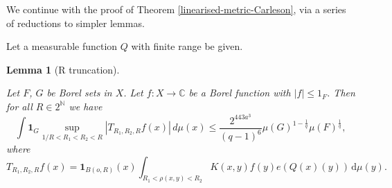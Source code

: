 \documentclass[10pt,a4paper]{article}
\theoremstyle{plain}
\newtheorem{lemma}[theorem]{Lemma}
\theoremstyle{definition}
\numberwithin{equation}{subsection}
\newcommand{\N}{{\mathbb{N}}}
\newcommand{\lean}[1]{}
\newcommand{\uses}[1]{}
\newcommand{\leanok}{}
\def\C{\mathbb{C}}
\begin{document}
We continue with the proof of Theorem \ref{linearised-metric-Carleson}, via a series of reductions to simpler lemmas.

Let a measurable function $Q$ with finite range be given.



\begin{lemma}[R truncation]
    \label{R-truncation}
    \leanok
    \lean{R_truncation}
    \uses{S-truncation}

    Let $F$, $G$ be Borel sets in $X$. Let $f:X\to \C$ be a Borel function with $|f|\le 1_F$. Then for all $R\in 2^\N$ we have
    \begin{equation} \label{Rcut}
        \int \mathbf{1}_G \sup_{1/R<R_1<R_2<R} |T_{R_1,R_2,R} f(x)|\, d\mu(x) \le \frac{2^{443a^3}}{(q-1)^6} \mu(G)^{1-\frac{1}{q}} \mu(F)^{\frac{1}{q}},
    \end{equation}
    where
    \begin{equation}\label{TRR}
        T_{R_1,R_2,R} f(x)= \mathbf{1}_{B(o,R)}(x)
        \int_{R_1 < \rho(x,y) < R_2} K(x,y) f(y) e(Q(x)(y)) \, \mathrm{d}\mu(y) .
    \end{equation}
\end{lemma}
\end{document}
